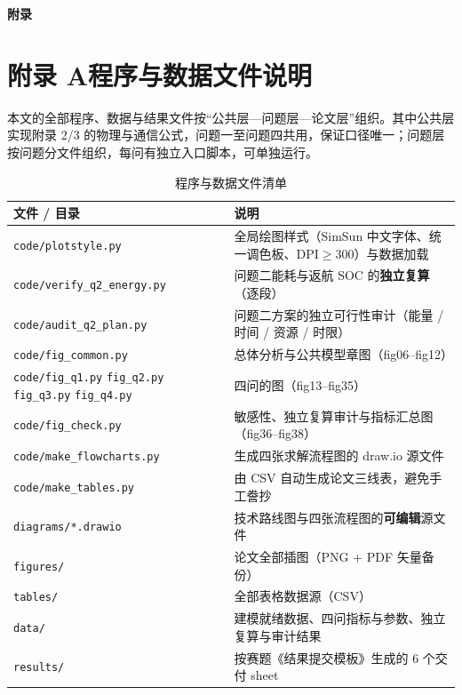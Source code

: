 \newpage
\appendix
\begin{center}
	{\bfseries 附\quad 录}
\end{center}

\section*{附录 A\quad 程序与数据文件说明}

本文的全部程序、数据与结果文件按“公共层—问题层—论文层”组织。其中公共层实现附录 2/3 的物理与通信公式，问题一至问题四共用，保证口径唯一；问题层按问题分文件组织，每问有独立入口脚本，可单独运行。

\begin{table}[htbp]
	\caption{程序与数据文件清单}
	\centering
	\begin{tabularx}{0.94\textwidth}{lX}
		\toprule
		文件 / 目录 & 说明 \\
		\midrule
		\texttt{code/plotstyle.py} & 全局绘图样式（SimSun 中文字体、统一调色板、DPI$\ge$300）与数据加载 \\
		\texttt{code/verify\_q2\_energy.py} & 问题二能耗与返航 SOC 的\textbf{独立复算}（逐段） \\
		\texttt{code/audit\_q2\_plan.py} & 问题二方案的独立可行性审计（能量 / 时间 / 资源 / 时限） \\
		\texttt{code/fig\_common.py} & 总体分析与公共模型章图（fig06--fig12） \\
		\texttt{code/fig\_q1.py} \texttt{fig\_q2.py} \texttt{fig\_q3.py} \texttt{fig\_q4.py} & 四问的图（fig13--fig35） \\
		\texttt{code/fig\_check.py} & 敏感性、独立复算审计与指标汇总图（fig36--fig38） \\
		\texttt{code/make\_flowcharts.py} & 生成四张求解流程图的 draw.io 源文件 \\
		\texttt{code/make\_tables.py} & 由 CSV 自动生成论文三线表，避免手工誊抄 \\
		\texttt{diagrams/*.drawio} & 技术路线图与四张流程图的\textbf{可编辑}源文件 \\
		\texttt{figures/} & 论文全部插图（PNG + PDF 矢量备份） \\
		\texttt{tables/} & 全部表格数据源（CSV） \\
		\texttt{data/} & 建模就绪数据、四问指标与参数、独立复算与审计结果 \\
		\texttt{results/} & 按赛题《结果提交模板》生成的 6 个交付 sheet \\
		\bottomrule
	\end{tabularx}
\end{table}

